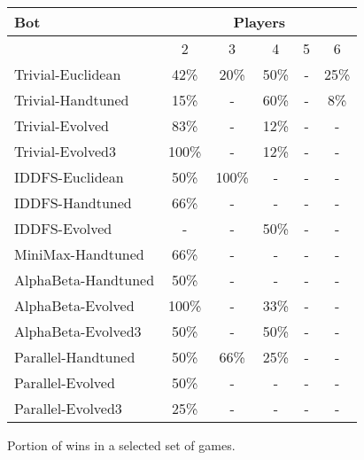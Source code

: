 \begin{figure}
\centering
\begin{tabular}{ | l | c | c | c | c | c | }
\hline
Bot & \multicolumn{5}{|c|}{Players} \\
\hline
& 2 & 3 & 4 & 5 & 6 \\
\hline
Trivial-Euclidean & 42\% & 20\% & 50\% & - & 25\% \\
\hline
Trivial-Handtuned & 15\% & - & 60\% & - & 8\% \\
\hline
Trivial-Evolved & 83\% & - & 12\% & - & - \\
\hline
Trivial-Evolved3 & 100\% & - & 12\% & - & - \\
\hline
IDDFS-Euclidean & 50\% & 100\% & - & - & - \\
\hline
IDDFS-Handtuned & 66\% & - & - & - & - \\
\hline
IDDFS-Evolved & - & - & 50\% & - & - \\
\hline
MiniMax-Handtuned & 66\% & - & - & - & - \\
\hline
AlphaBeta-Handtuned & 50\% & - & - & - & - \\
\hline
AlphaBeta-Evolved & 100\% & - & 33\% & - & - \\
\hline
AlphaBeta-Evolved3 & 50\% & - & 50\% & - & - \\
\hline
Parallel-Handtuned & 50\% & 66\% & 25\% & - & - \\
\hline
Parallel-Evolved & 50\% & - & - & - & - \\
\hline
Parallel-Evolved3 & 25\% & - & - & - & - \\
\hline
\end{tabular}
\caption{Portion of wins in a selected set of games.}
\label{stats}
\end{figure}

